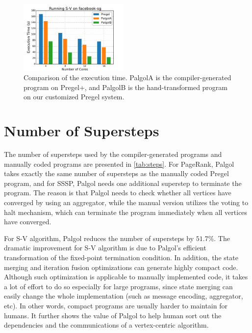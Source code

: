 \documentclass{sokendai_thesis} %
\begin{document}
\begin{figure}
\includegraphics[width=0.48\textwidth]{plot/exec_svppa_facebook-sg.pdf}
\caption{Comparison of the execution time. PalgolA is the compiler-generated program on Pregel+, and PalgolB is the hand-transformed program on our customized Pregel system.}
\label{fig:exec}
\end{figure}

\section{Number of Supersteps}

The number of supersteps used by the compiler-generated programs and manually coded programs are presented in \autoref{tab:steps}.
For PageRank, Palgol takes exactly the same number of supersteps as the manually coded Pregel program, and for SSSP, Palgol needs one additional superstep to terminate the program.
The reason is that Palgol needs to check whether all vertices have converged by using an aggregator, while the manual version utilizes the voting to halt mechanism, which can terminate the program immediately when all vertices have converged.

For S-V algorithm, Palgol reduces the number of supersteps by $51.7\%$.
The dramatic improvement for S-V algorithm is due to Palgol's efficient transformation of the fixed-point termination condition.
In addition, the state merging and iteration fusion optimizations can generate highly compact code.
Although such optimization is applicable to manually implemented code, it takes a lot of effort to do so especially for large programs, since state merging can easily change the whole implementation (such as message encoding, aggregator, etc).
In other words, compact programs are usually harder to maintain for humans.
It further shows the value of Palgol to help human sort out the dependencies and the communications of a vertex-centric algorithm.
\end{document}
